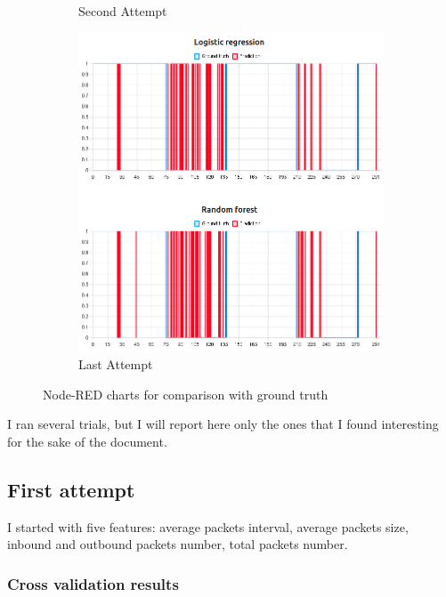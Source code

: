\documentclass[12pt, conference]{IEEEtran}
\begin{document}
\begin{figure}[t]
\begin{subfigure}[b]{.33\linewidth}
        \caption{Second Attempt}
        \label{fig:chart-second-attempt}
    \end{subfigure}
    \begin{subfigure}[b]{.33\linewidth}
        \centering
        \includegraphics[width=\linewidth]{resources/prediction_with_inbound_and_outbound_features_bitrate_cropped.png}
        \caption{Last Attempt}
        \label{fig:chart-third-attempt}
    \end{subfigure}
    \caption{Node-RED charts for comparison with ground truth}
    \label{fig:charts-node-red}
\end{figure}

I ran several trials, but I will report here only the ones that I found interesting for the sake of the document.

\subsection{First attempt}
I started with five features: average packets interval, average packets size, inbound and outbound packets number, total packets number.

\subsubsection{Cross validation results}
\end{document}
